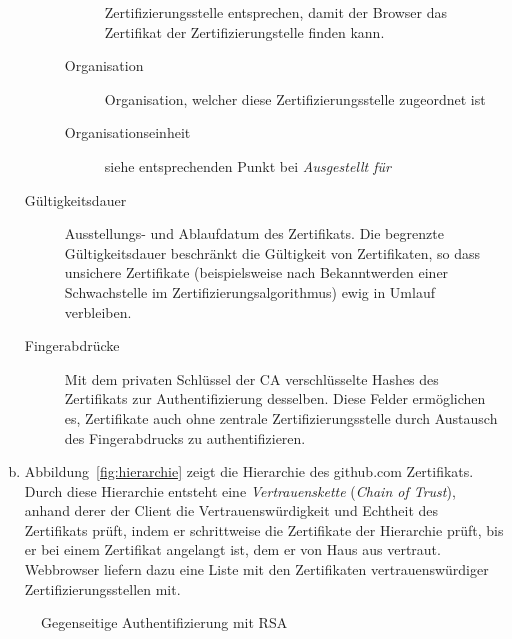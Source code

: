 \documentclass[11pt,a4paper]{scrartcl}
\begin{document}
\begin{enumerate}[a)]
\begin{description}
\begin{description}
      Zertifizierungsstelle entsprechen, damit der Browser das Zertifikat der
      Zertifizierungstelle finden kann.
    \item[Organisation] Organisation, welcher diese Zertifizierungsstelle
      zugeordnet ist
    \item[Organisationseinheit] siehe entsprechenden Punkt bei
      \emph{Ausgestellt für}
    \end{description}
  \item[Gültigkeitsdauer] Ausstellungs- und Ablaufdatum des Zertifikats.  Die
    begrenzte Gültigkeitsdauer beschränkt die Gültigkeit von Zertifikaten, so
    dass unsichere Zertifikate (beispielsweise nach Bekanntwerden einer
    Schwachstelle im Zertifizierungsalgorithmus) ewig in Umlauf verbleiben.
  \item[Fingerabdrücke] Mit dem privaten Schlüssel der CA verschlüsselte Hashes
    des Zertifikats zur Authentifizierung desselben.  Diese Felder ermöglichen
    es, Zertifikate auch ohne zentrale Zertifizierungsstelle durch Austausch
    des Fingerabdrucks zu authentifizieren.
  \end{description}
\item Abbildung~\ref{fig:hierarchie} zeigt die Hierarchie des github.com
  Zertifikats.  Durch diese Hierarchie entsteht eine \emph{Vertrauenskette}
  (\emph{Chain of Trust}), anhand derer der Client die Vertrauenswürdigkeit und
  Echtheit des Zertifikats prüft, indem er schrittweise die Zertifikate der
  Hierarchie prüft, bis er bei einem Zertifikat angelangt ist, dem er von Haus
  aus vertraut.  Webbrowser liefern dazu eine Liste mit den Zertifikaten
  vertrauenswürdiger Zertifizierungsstellen mit.
\end{enumerate}

\begin{figure}[h]
  \centering
  \caption{Gegenseitige Authentifizierung mit RSA}
  \label{fig:authentifizierung}
\end{figure}
\end{document}
